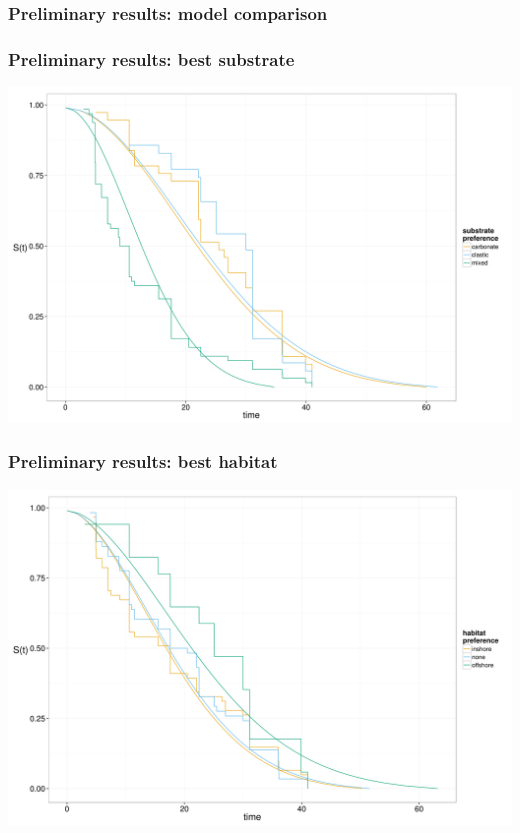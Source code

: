 \documentclass{beamer}
\begin{document}
\begin{frame}
  \frametitle{Preliminary results: model comparison}

  
\end{frame}

\begin{frame}
  \frametitle{Preliminary results: best substrate}

  \begin{center}
    \includegraphics[height = 0.8\textheight, width = \textwidth, keepaspectratio = true]{figure/aff}
  \end{center}
\end{frame}

\begin{frame}
  \frametitle{Preliminary results: best habitat}

  \begin{center}
    \includegraphics[height = 0.8\textheight, width = \textwidth, keepaspectratio = true]{figure/hab}
  \end{center}
\end{frame}
\end{document}
